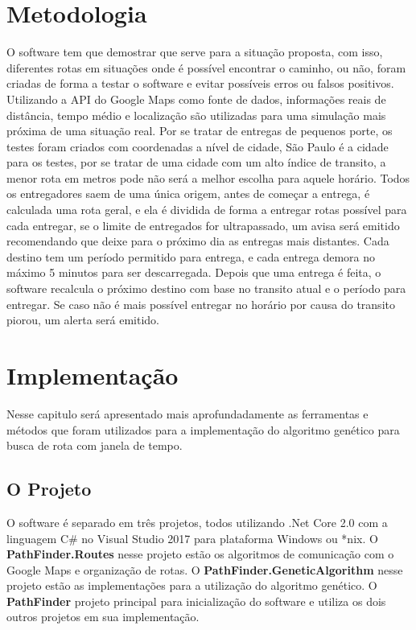 \chapter{Metodologia}
O software tem que demostrar que serve para a situação proposta, com isso, diferentes rotas em situações onde é possível encontrar o caminho, ou não, foram criadas de forma a testar o software e evitar possíveis erros ou falsos positivos.
Utilizando a API do Google Maps como fonte de dados, informações reais de distância, tempo médio e localização são utilizadas para uma simulação mais próxima de uma situação real.
Por se tratar de entregas de pequenos porte, os testes foram criados com coordenadas a nível de cidade, São Paulo é a cidade para os testes, por se tratar de uma cidade com um alto índice de transito, a menor rota em metros pode não será a melhor escolha para aquele horário.
Todos os entregadores saem de uma única origem, antes de começar a entrega, é calculada uma rota geral, e ela é dividida de forma a entregar rotas possível para cada entregar, se o limite de entregados for ultrapassado, um avisa será emitido recomendando que deixe para o próximo dia as entregas mais distantes.
Cada destino tem um período permitido para entrega, e cada entrega demora no máximo 5 minutos para ser descarregada. Depois que uma entrega é feita, o software recalcula o próximo destino com base no transito atual e o período para entregar.
Se caso não é mais possível entregar no horário por causa do transito piorou, um alerta será emitido.

\chapter{Implementação}
 
Nesse capitulo será apresentado mais aprofundadamente as ferramentas e métodos que foram utilizados para a implementação do algoritmo genético para busca de rota com janela de tempo.
 
\section{O Projeto}
O software é separado em três projetos, todos utilizando .Net Core 2.0 com a linguagem C\# no Visual Studio 2017 para plataforma Windows ou \**nix.
O \textbf{PathFinder.Routes} nesse projeto estão os algoritmos de comunicação com o Google Maps e organização de rotas. 
O \textbf{PathFinder.GeneticAlgorithm} nesse projeto estão as implementações para a utilização do algoritmo genético.
O \textbf{PathFinder} projeto principal para inicialização do software e utiliza os dois outros projetos em sua implementação.

